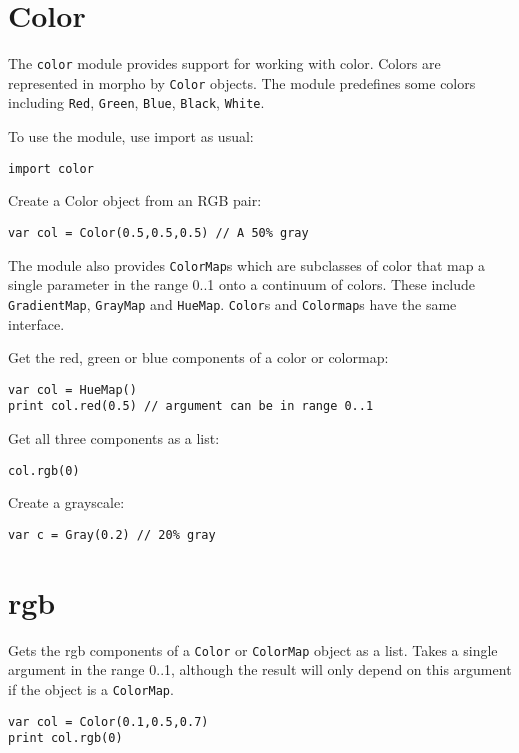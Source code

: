\hypertarget{color}{%
\section{Color}\label{color}}

The \texttt{color} module provides support for working with color.
Colors are represented in morpho by \texttt{Color} objects. The module
predefines some colors including \texttt{Red}, \texttt{Green},
\texttt{Blue}, \texttt{Black}, \texttt{White}.

To use the module, use import as usual:

\begin{lstlisting}
import color
\end{lstlisting}

Create a Color object from an RGB pair:

\begin{lstlisting}
var col = Color(0.5,0.5,0.5) // A 50% gray
\end{lstlisting}

The module also provides \texttt{ColorMap}s which are subclasses of
color that map a single parameter in the range 0..1 onto a continuum of
colors. These include \texttt{GradientMap}, \texttt{GrayMap} and
\texttt{HueMap}. \texttt{Color}s and \texttt{Colormap}s have the same
interface.

Get the red, green or blue components of a color or colormap:

\begin{lstlisting}
var col = HueMap()
print col.red(0.5) // argument can be in range 0..1
\end{lstlisting}

Get all three components as a list:

\begin{lstlisting}
col.rgb(0)
\end{lstlisting}

Create a grayscale:

\begin{lstlisting}
var c = Gray(0.2) // 20% gray
\end{lstlisting}

\hypertarget{rgb}{%
\section{rgb}\label{rgb}}

Gets the rgb components of a \texttt{Color} or \texttt{ColorMap} object
as a list. Takes a single argument in the range 0..1, although the
result will only depend on this argument if the object is a
\texttt{ColorMap}.

\begin{lstlisting}
var col = Color(0.1,0.5,0.7)
print col.rgb(0)
\end{lstlisting}
